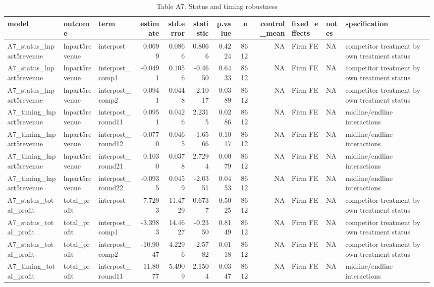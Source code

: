 \begin{table}

\caption{Table A7. Status and timing robustness}
\centering
\begin{tabular}[t]{lllrrrrrrlll}
\toprule
model & outcome & term & estimate & std.error & statistic & p.value & n & control\_mean & fixed\_effects & notes & specification\\
\midrule
A7\_status\_lnpart5revenue & lnpart5revenue & interpost & 0.0699 & 0.0866 & 0.8066 & 0.4224 & 8612 & NA & Firm FE & NA & competitor treatment by own treatment status\\
A7\_status\_lnpart5revenue & lnpart5revenue & interpost\_comp1 & -0.0491 & 0.1056 & -0.4650 & 0.6433 & 8612 & NA & Firm FE & NA & competitor treatment by own treatment status\\
A7\_status\_lnpart5revenue & lnpart5revenue & interpost\_comp2 & -0.0941 & 0.0448 & -2.1017 & 0.0389 & 8612 & NA & Firm FE & NA & competitor treatment by own treatment status\\
A7\_timing\_lnpart5revenue & lnpart5revenue & interpost\_round11 & 0.0951 & 0.0426 & 2.2315 & 0.0286 & 8612 & NA & Firm FE & NA & midline/endline interactions\\
A7\_timing\_lnpart5revenue & lnpart5revenue & interpost\_round12 & -0.0770 & 0.0465 & -1.6566 & 0.1017 & 8612 & NA & Firm FE & NA & midline/endline interactions\\
\addlinespace
A7\_timing\_lnpart5revenue & lnpart5revenue & interpost\_round21 & 0.1030 & 0.0378 & 2.7294 & 0.0079 & 8612 & NA & Firm FE & NA & midline/endline interactions\\
A7\_timing\_lnpart5revenue & lnpart5revenue & interpost\_round22 & -0.0935 & 0.0459 & -2.0351 & 0.0453 & 8612 & NA & Firm FE & NA & midline/endline interactions\\
A7\_status\_total\_profit & total\_profit & interpost & 7.7293 & 11.4729 & 0.6737 & 0.5025 & 8612 & NA & Firm FE & NA & competitor treatment by own treatment status\\
A7\_status\_total\_profit & total\_profit & interpost\_comp1 & -3.3983 & 14.4627 & -0.2350 & 0.8149 & 8612 & NA & Firm FE & NA & competitor treatment by own treatment status\\
A7\_status\_total\_profit & total\_profit & interpost\_comp2 & -10.9047 & 4.2296 & -2.5782 & 0.0118 & 8612 & NA & Firm FE & NA & competitor treatment by own treatment status\\
\addlinespace
A7\_timing\_total\_profit & total\_profit & interpost\_round11 & 11.8077 & 5.4909 & 2.1504 & 0.0347 & 8612 & NA & Firm FE & NA & midline/endline interactions\\

\end{tabular}
\end{table}
